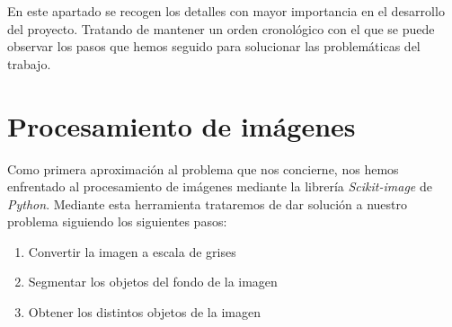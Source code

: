 
En este apartado se recogen los detalles con mayor importancia en el desarrollo del proyecto. Tratando de mantener un orden cronológico con el que se puede observar los pasos que hemos seguido para solucionar las problemáticas del trabajo.

\begin{comment}
Este apartado pretende recoger los aspectos más interesantes del desarrollo del proyecto, comentados por los autores del mismo.
Debe incluir desde la exposición del ciclo de vida utilizado, hasta los detalles de mayor relevancia de las fases de análisis, diseño e implementación.
Se busca que no sea una mera operación de copiar y pegar diagramas y extractos del código fuente, sino que realmente se justifiquen los caminos de solución que se han tomado, especialmente aquellos que no sean triviales.
Puede ser el lugar más adecuado para documentar los aspectos más interesantes del diseño y de la implementación, con un mayor hincapié en aspectos tales como el tipo de arquitectura elegido, los índices de las tablas de la base de datos, normalización y desnormalización, distribución en ficheros3, reglas de negocio dentro de las bases de datos (EDVHV GH GDWRV DFWLYDV), aspectos de desarrollo relacionados con el WWW...
Este apartado, debe convertirse en el resumen de la experiencia práctica del proyecto, y por sí mismo justifica que la memoria se convierta en un documento útil, fuente de referencia para los autores, los tutores y futuros alumnos.
\end{comment}

\section{Procesamiento de imágenes}
\label{procimg}
Como primera aproximación al problema que nos concierne, nos hemos enfrentado al procesamiento de imágenes mediante la librería \textit{Scikit-image} de \textit{Python}. Mediante esta herramienta trataremos de dar solución a nuestro problema siguiendo los siguientes pasos:

\begin{enumerate}[1.]
  \item Convertir la imagen a escala de grises
  \item Segmentar los objetos del fondo de la imagen
  \item Obtener los distintos objetos de la imagen
\end{enumerate}

